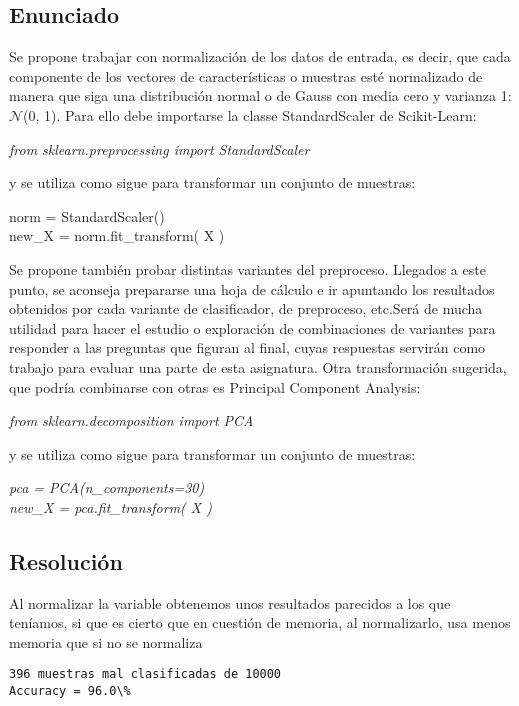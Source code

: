 \documentclass[12pt,twoside]{article}
\begin{document}
\subsection{Enunciado}

\noindent
Se propone trabajar con normalización de los datos de entrada, es decir, que cada componente de los vectores de características o muestras esté normalizado de manera que siga una distribución normal o de Gauss con media cero y varianza 1: $\mathcal{N}$(0, 1). Para ello debe importarse la classe StandardScaler de Scikit-Learn: 
\begin{center}
\textit{from sklearn.preprocessing import StandardScaler}
\end{center}
y se utiliza como sigue para transformar un conjunto de muestras:
\begin{center}
norm = StandardScaler()\\
new\_X = norm.fit\_transform( X )
\end{center}
Se propone también probar distintas variantes del preproceso. Llegados a este punto, se aconseja prepararse una hoja de cálculo e ir apuntando los resultados obtenidos por cada variante de clasificador, de preproceso, etc.Será de mucha utilidad para hacer el estudio o exploración de combinaciones de variantes para responder a las preguntas que figuran al final, cuyas respuestas servirán como trabajo para evaluar una parte de esta asignatura. Otra transformación sugerida, que podría combinarse con otras es Principal Component Analysis:
\begin{center}
\textit{from sklearn.decomposition import PCA}
\end{center}

y se utiliza como sigue para transformar un conjunto de muestras:
\begin{center}
\textit{pca = PCA(n\_components=30)}\\
\textit{new\_X = pca.fit\_transform( X )}
\end{center}

\subsection{Resolución}
Al normalizar la variable obtenemos unos resultados parecidos a los que teníamos, si que es cierto que en cuestión de memoria, al normalizarlo, usa menos memoria que si no se normaliza
\begin{lstlisting}
396 muestras mal clasificadas de 10000
Accuracy = 96.0\%
\end{lstlisting}
\end{document}
